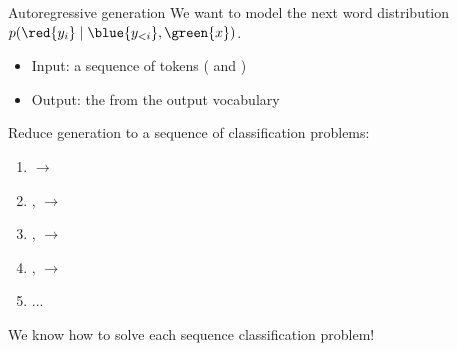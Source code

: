 \documentclass[usenames,dvipsnames,notes,11pt,aspectratio=169,hyperref={colorlinks=true, linkcolor=blue}]{beamer}
\begin{document}
\begin{frame}
    {Autoregressive generation}
    We want to model the {next word distribution} $p(\red{y_i}\mid \blue{y_{<i}}, \green{x})$.\\
    \begin{itemize}
        \item Input: a sequence of tokens ( and )
        \item Output: the  from the output vocabulary
    \end{itemize}

    \pause
    Reduce generation to a sequence of classification problems:\\
    \begin{enumerate}[<+->]
        \item {}
            $\to$ 
        \item {},
            $\to$ 
        \item {},
            $\to$ 
        \item {},
            $\to$ 
        \item ...
    \end{enumerate}

    \pause
    We know how to solve each sequence classification problem! 

\end{frame}
\end{document}
